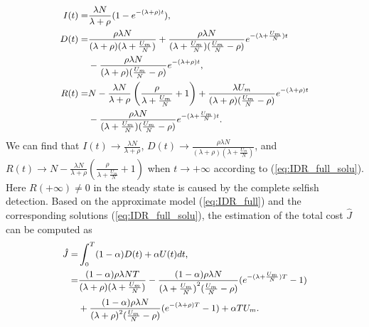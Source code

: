 \begin{equation}
\begin{small}
\label{eq:IDR_full_solu}
\begin{aligned}
I(t) =& \frac{ \lambda N }{ \lambda + \rho }
(1- e^{-(\lambda + \rho)t}),\\
D(t) =& \frac{ \rho \lambda N }{ (\lambda + \rho)
(\lambda + \frac{U_{m}}{N}) }
+ \frac{\rho \lambda N}{(\lambda + \frac{U_{m}}{N})
(\frac{U_{m}}{N} - \rho)}
e^{-(\lambda + \frac{U_{m}}{N})t}\\
& - \frac{ \rho \lambda N }{ (\lambda + \rho)
(\frac{U_{m}}{N} - \rho) }
e^{-(\lambda + \rho)t},\\
R(t) =& N - \frac{ \lambda N }{ \lambda + \rho }
\left( \frac{\rho}{\lambda + \frac{U_{m}}{N}} + 1 \right)
+ \frac{ \lambda U_{m} }{ (\lambda + \rho)
(\frac{U_{m}}{N} - \rho) } e^{-(\lambda + \rho)t}\\
& - \frac{\rho \lambda N}{(\lambda + \frac{U_{m}}{N})
(\frac{U_{m}}{N} - \rho)}  e^{-(\lambda + \frac{U_{m}}{N})t}.
\end{aligned}
\end{small}
\end{equation}
We can find that $I(t) \rightarrow
\frac{ \lambda N }{ \lambda + \rho }$,
$D(t) \rightarrow \frac{ \rho \lambda N }
{ (\lambda + \rho)(\lambda + \frac{U_{m}}{N}) }$,
and $R(t) \rightarrow
N - \frac{ \lambda N }{ \lambda + \rho }
\left( \frac{\rho}{\lambda + \frac{U_{m}}{N}} + 1 \right)$
when $t \rightarrow +\infty$ according to (\ref{eq:IDR_full_solu}).
Here $R(+\infty) \neq 0$ in the steady state
is caused by the complete selfish detection.
Based on the approximate model (\ref{eq:IDR_full})
and the corresponding solutions (\ref{eq:IDR_full_solu}),
the estimation of the total cost $\hat{J}$
can be computed as
\begin{equation}
\begin{small}
\label{eq:IDR_full_J}
\begin{aligned}
\hat{J} =& \int_{0}^{T} (1-\alpha) D(t) + \alpha U(t) dt, \\
=& \frac{ (1-\alpha) \rho \lambda N T }{ (\lambda + \rho)(\lambda + \frac{U_{m}}{N}) }
- \frac{(1-\alpha) \rho \lambda N}{ {(\lambda + \frac{U_{m}}{N})}^{2} (\frac{U_{m}}{N} - \rho)}
(e^{-(\lambda + \frac{U_{m}}{N})T} - 1 ) \\
&+ \frac{(1-\alpha) \rho \lambda N }{ {(\lambda + \rho)}^{2} (\frac{U_{m}}{N} - \rho) }
(e^{-(\lambda + \rho)T} - 1 )
+ \alpha T U_{m}.
\end{aligned}
\end{small}
\end{equation}
